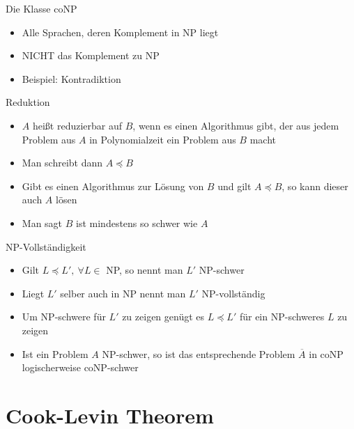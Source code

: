 \documentclass[ignorenonframetext,]{beamer}
\begin{document}
\begin{frame}{Die Klasse coNP}

\begin{itemize}
\itemsep1pt\parskip0pt
\item
  Alle Sprachen, deren Komplement in NP liegt
\item
  NICHT das Komplement zu NP
\item
  Beispiel: Kontradiktion
\end{itemize}

\end{frame}

\begin{frame}{Reduktion}

\begin{itemize}
\itemsep1pt\parskip0pt
\item
  $A$ heißt reduzierbar auf $B$, wenn es einen Algorithmus gibt, der aus
  jedem Problem aus $A$ in Polynomialzeit ein Problem aus $B$ macht
\item
  Man schreibt dann $A \preceq B$
\item
  Gibt es einen Algorithmus zur Lösung von $B$ und gilt $A \preceq B$,
  so kann dieser auch $A$ lösen
\item
  Man sagt $B$ ist mindestens so schwer wie $A$
\end{itemize}

\end{frame}

\begin{frame}{NP-Vollständigkeit}

\begin{itemize}
\itemsep1pt\parskip0pt
\item
  Gilt $L \preceq L',\ \forall L \in$ NP, so nennt man $L'$ NP-schwer
\item
  Liegt $L'$ selber auch in NP nennt man $L'$ NP-vollständig
\item
  Um NP-schwere für $L'$ zu zeigen genügt es $L \preceq L'$ für ein
  NP-schweres $L$ zu zeigen
\item
  Ist ein Problem $A$ NP-schwer, so ist das entsprechende Problem
  $\overline{A}$ in coNP logischerweise coNP-schwer
\end{itemize}

\end{frame}

\section{Cook-Levin Theorem}\label{cook-levin-theorem}
\end{document}
